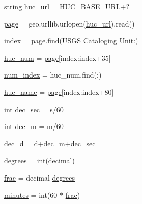 \begin{DoxyCompactItemize}
\item 
string \hyperlink{namespaceget__geo___h_u_c_a116c62a95390733e5851cce08e203e01}{huc\+\_\+url} = \hyperlink{namespaceget__geo___h_u_c_aec26fed42e6a2aa5dd3adef771e80f56}{H\+U\+C\+\_\+\+B\+A\+S\+E\+\_\+\+U\+RL}+\textquotesingle{}?\textquotesingle{}
\item 
\hyperlink{namespaceget__geo___h_u_c_a9a9f27e6a575181fcea56a1baed08456}{page} = geo.\+urllib.\+urlopen(\hyperlink{namespaceget__geo___h_u_c_a116c62a95390733e5851cce08e203e01}{huc\+\_\+url}).read()
\item 
\hyperlink{namespaceget__geo___h_u_c_a7d1d839fc837e44e52f5fba440d56faa}{index} = page.\+find(\textquotesingle{}U\+S\+GS Cataloging Unit\+:\textquotesingle{})
\item 
\hyperlink{namespaceget__geo___h_u_c_a67ca2e90497c71a6704c6755bca3082b}{huc\+\_\+num} = \hyperlink{namespaceget__geo___h_u_c_a9a9f27e6a575181fcea56a1baed08456}{page}\mbox{[}index\+:index+35\mbox{]}
\item 
\hyperlink{namespaceget__geo___h_u_c_a0e71504390ae6e1820bf73cf9cbc149f}{num\+\_\+index} = huc\+\_\+num.\+find(\textquotesingle{}\+:\textquotesingle{})
\item 
\hyperlink{namespaceget__geo___h_u_c_abade12bbf1229daaa34a0760a56ef195}{huc\+\_\+name} = \hyperlink{namespaceget__geo___h_u_c_a9a9f27e6a575181fcea56a1baed08456}{page}\mbox{[}index\+:index+80\mbox{]}
\item 
int \hyperlink{namespaceget__geo___h_u_c_aa6c84e39c9fc06d8d30722ddc165d320}{dec\+\_\+sec} = s/60
\item 
int \hyperlink{namespaceget__geo___h_u_c_a1cfdb988f3eb1e0c20b5d08ce96d901d}{dec\+\_\+m} = m/60
\item 
\hyperlink{namespaceget__geo___h_u_c_a37be49575af3bb798889e4fcce1f79fe}{dec\+\_\+d} = d+\hyperlink{namespaceget__geo___h_u_c_a1cfdb988f3eb1e0c20b5d08ce96d901d}{dec\+\_\+m}+\hyperlink{namespaceget__geo___h_u_c_aa6c84e39c9fc06d8d30722ddc165d320}{dec\+\_\+sec}
\item 
\hyperlink{namespaceget__geo___h_u_c_adb089a41ce48669080941422b65583fc}{degrees} = int(decimal)
\item 
\hyperlink{namespaceget__geo___h_u_c_a14d62b5f7d112b3f57e1e8dca6ef5dee}{frac} = decimal-\/\hyperlink{namespaceget__geo___h_u_c_adb089a41ce48669080941422b65583fc}{degrees}
\item 
\hyperlink{namespaceget__geo___h_u_c_a8aeb9eaada16136431fe16303cf97135}{minutes} = int(60 $\ast$ \hyperlink{namespaceget__geo___h_u_c_a14d62b5f7d112b3f57e1e8dca6ef5dee}{frac})

\end{DoxyCompactItemize}
